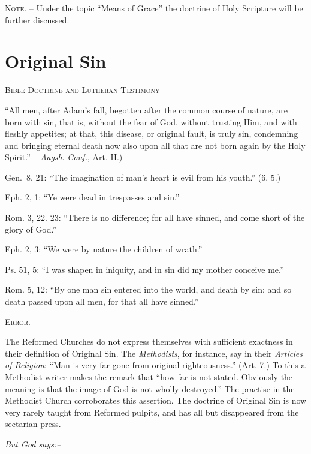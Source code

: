 \documentclass[
]{book}
\begin{document}
\textsc{Note.} -- Under the topic ``Means of Grace'' the doctrine of Holy Scripture will be further discussed.

\section{Original Sin}\label{original-sin}

\begin{center}
\textsc{Bible Doctrine and Lutheran Testimony}
\end{center}

``All men, after Adam's fall, begotten after the common course of nature, are born with sin, that is, without the fear of God, without trusting Him, and with fleshly appetites; at that, this disease, or original fault, is truly sin, condemning and bringing eternal death now also upon all that are not born again by the Holy Spirit.'' -- \emph{Augsb. Conf.}, Art. II.)

Gen.~8, 21: ``The imagination of man's heart is evil from his youth.'' (6, 5.)

Eph. 2, 1: ``Ye were dead in trespasses and sin.''

Rom. 3, 22. 23: ``There is no difference; for all have sinned, and come short of the glory of God.''

Eph. 2, 3: ``We were by nature the children of wrath.''

Ps. 51, 5: ``I was shapen in iniquity, and in sin did my mother conceive me.''

Rom. 5, 12: ``By one man sin entered into the world, and death by sin; and so death passed upon all men, for that all have sinned.''

\begin{center}
\textsc{Error.}
\end{center}

The Reformed Churches do not express themselves with sufficient exactness in their definition of Original Sin. The \emph{Methodists}, for instance, say in their \emph{Articles of Religion}: ``Man is very far gone from original righteousness.'' (Art. 7.) To this a Methodist writer makes the remark that ``how far is not stated. Obviously the meaning is that the image of God is not wholly destroyed.'' The practise in the Methodist Church corroborates this assertion. The doctrine of Original Sin is now very rarely taught from Reformed pulpits, and has all but disappeared from the sectarian press.

\begin{center}
\textsl{But God says:--}
\end{center}
\end{document}
